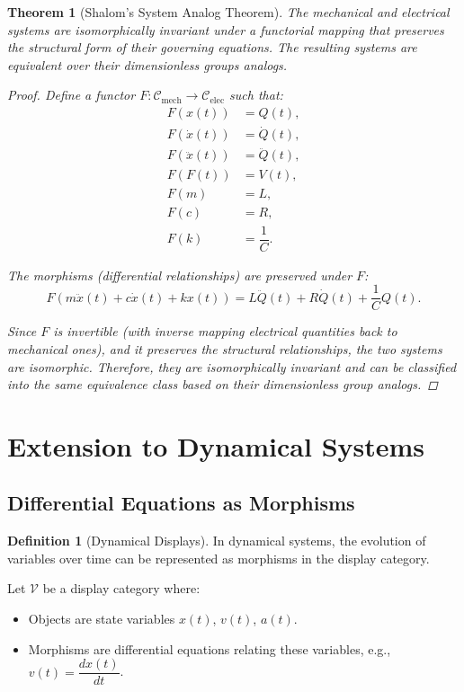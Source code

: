 \documentclass{article}
\newtheorem{theorem}{Theorem}[section]
\theoremstyle{definition}
\newtheorem{definition}{Definition}[section]
\theoremstyle{remark}
\begin{document}
	\begin{theorem}[Shalom's System Analog Theorem]
		The mechanical and electrical systems are isomorphically invariant under a functorial mapping that preserves the structural form of their governing equations.  The resulting systems are equivalent over their dimensionless groups analogs.
		
		\begin{proof}
			Define a functor $F: \mathcal{C}_{\text{mech}} \rightarrow \mathcal{C}_{\text{elec}}$ such that:
			\begin{align*}
				F(x(t)) &= Q(t), \\
				F(\dot{x}(t)) &= \dot{Q}(t), \\
				F(\ddot{x}(t)) &= \ddot{Q}(t), \\
				F(F(t)) &= V(t), \\
				F(m) &= L, \\
				F(c) &= R, \\
				F(k) &= \dfrac{1}{C}.
			\end{align*}
			
			The morphisms (differential relationships) are preserved under $F$:
			\[
			F\left( m \ddot{x}(t) + c \dot{x}(t) + k x(t) \right) = L \ddot{Q}(t) + R \dot{Q}(t) + \dfrac{1}{C} Q(t).
			\]
			
			Since $F$ is invertible (with inverse mapping electrical quantities back to mechanical ones), and it preserves the structural relationships, the two systems are isomorphic. Therefore, they are isomorphically invariant and can be classified into the same equivalence class based on their dimensionless group analogs.
		\end{proof}
	\end{theorem}
	
	\section{Extension to Dynamical Systems}
	
	\subsection{Differential Equations as Morphisms}
	
	\begin{definition}[Dynamical Displays]
		In dynamical systems, the evolution of variables over time can be represented as morphisms in the display category.
		
		Let $\mathcal{V}$ be a display category where:
		\begin{itemize}
			\item Objects are state variables $x(t)$, $v(t)$, $a(t)$.
			\item Morphisms are differential equations relating these variables, e.g., $v(t) = \dfrac{dx(t)}{dt}$.
		\end{itemize}
	\end{definition}
	
\end{document}
